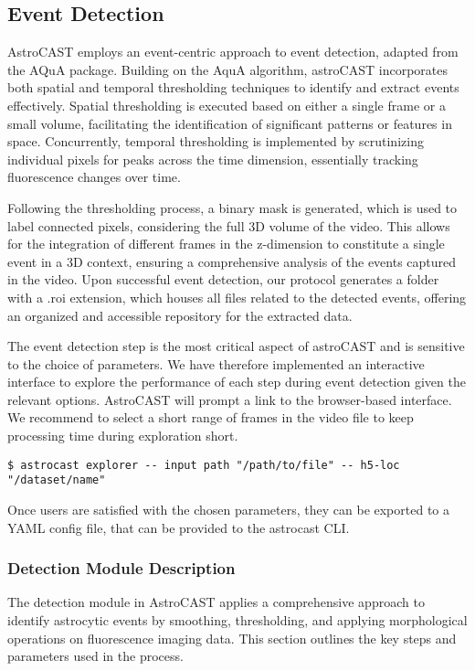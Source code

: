 \subsection{Event Detection}

AstroCAST employs an event-centric approach to event detection, adapted from the AQuA package\citep{wang_event-based_2018}. Building on the AquA algorithm, astroCAST incorporates both spatial and temporal thresholding
techniques to identify and extract events effectively. Spatial thresholding is executed based on either a single
frame or a small volume, facilitating the identification of significant patterns or features in space. Concurrently,
temporal thresholding is implemented by scrutinizing individual pixels for peaks across the time dimension,
essentially tracking fluorescence changes over time.

Following the thresholding process, a binary mask is generated, which is used to label connected pixels, considering
the full 3D volume of the video. This allows for the integration of different frames in the z-dimension to constitute
a single event in a 3D context, ensuring a comprehensive analysis of the events captured in the video. Upon
successful event detection, our protocol generates a folder with a .roi extension, which houses all files
related to the detected events, offering an organized and accessible repository for the extracted data.

The event detection step is the most critical aspect of astroCAST and is sensitive to the choice of parameters. We
have therefore implemented an interactive interface to explore the performance of each step during event detection
given the relevant options. AstroCAST will prompt a link to the browser-based interface. We recommend to select a
short range of frames in the video file to keep processing time during exploration short.

\begin{lstlisting}[style=bashStyle]
    $ astrocast explorer -- input path "/path/to/file" -- h5-loc "/dataset/name"
\end{lstlisting}

Once users are satisfied with the chosen parameters, they can be exported to a YAML config file, that can be provided
to the astrocast \ac{CLI}.

\subsubsection{Detection Module Description}
The detection module in AstroCAST applies a comprehensive approach to identify astrocytic events by smoothing,
thresholding, and applying morphological operations on fluorescence imaging data. This section outlines the key steps
and parameters used in the process.

